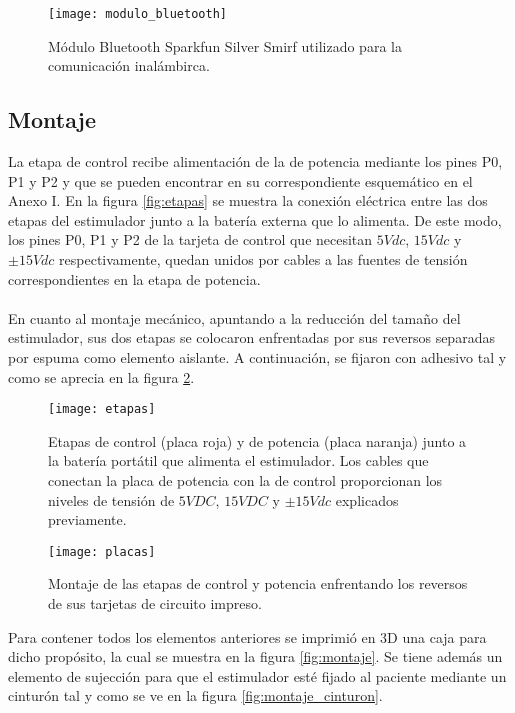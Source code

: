 \begin{figure}[!htb]
\centering
\texttt{[image: modulo\_bluetooth]}
  \caption{Módulo Bluetooth Sparkfun Silver Smirf utilizado para la comunicación inalámbirca\cite{modulo_bluetooth}.}\label{fig:modulo_bluetooth}
\end{figure}

\subsection{Montaje}
La etapa de control recibe alimentación de la de potencia mediante los pines P0, P1 y P2 y que se pueden encontrar en su correspondiente esquemático en el Anexo I. En la figura \ref{fig:etapas} se muestra la conexión eléctrica entre las dos etapas del estimulador junto a la batería externa que lo alimenta. De este modo, los pines P0, P1 y P2 de la tarjeta de control que necesitan $5Vdc$, $15Vdc$ y $\pm15Vdc$ respectivamente, quedan unidos por cables a las fuentes de tensión correspondientes en la etapa de potencia.
\\
\\
En cuanto al montaje mecánico, apuntando a la reducción del tamaño del estimulador, sus dos etapas se colocaron enfrentadas por sus reversos separadas por espuma como elemento aislante. A continuación, se fijaron con adhesivo tal y como se aprecia en la figura \ref{fig:placas}.\\

\begin{figure}[!htb]
  \texttt{[image: etapas]}
  \caption{Etapas de control (placa roja) y de potencia (placa naranja) junto a la batería portátil que alimenta el estimulador. Los cables que conectan la placa de potencia con la de control proporcionan los niveles de tensión de $5VDC$, $15VDC$ y $\pm15Vdc$ explicados previamente.}\label{fig:etapas}
\endminipage\hfill
{}
  \texttt{[image: placas]}
  \caption{Montaje de las etapas de control y potencia enfrentando los reversos de sus tarjetas de circuito impreso.}\label{fig:placas}
\endminipage\hfill
\end{figure}

Para contener todos los elementos anteriores se imprimió en 3D una caja para dicho propósito, la cual se muestra en la figura \ref{fig:montaje}. Se tiene además un elemento de sujección para que el estimulador esté fijado al paciente mediante un cinturón tal y como se ve en la figura \ref{fig:montaje_cinturon}.\\

